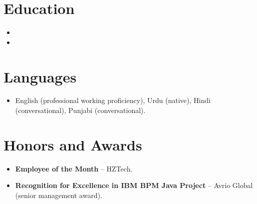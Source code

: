 \documentclass[11pt,a4paper,sans]{moderncv}
\begin{document}

\section{Education}
\vspace{1pt}
\begin{itemize}

\item{}

\vspace{3pt}

\item{}

\end{itemize}


\section{Languages}
\vspace{1pt}
\begin{itemize}
\item {English (professional working proficiency), Urdu (native), Hindi (conversational), Punjabi (conversational).}
\end{itemize}


\section{Honors and Awards}
\vspace{1pt}
\begin{itemize}
\item{\textbf{Employee of the Month} -- HZTech.}
\item{\textbf{Recognition for Excellence in IBM BPM Java Project} -- Avrio Global (senior management award).}
\end{itemize}
\end{document}

